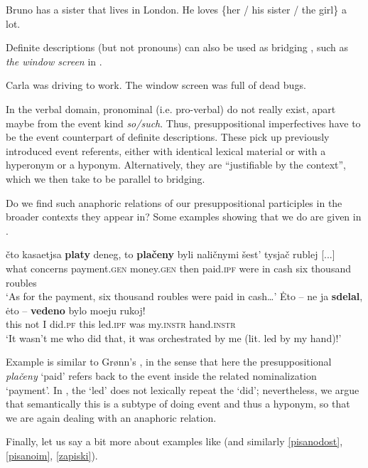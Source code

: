 \documentclass[output=paper,modfonts,newtxmath,hidelinks
\ChapterDOI{10.5281/zenodo.2545513}
]{langscibook}
\begin{document}
\ea Bruno has a sister that lives in London. He loves \{her / his sister / the girl\} a lot.\label{Bruno}
\z

\noindent Definite descriptions (but not pronouns) can also be used as bridging , such as \textit{the window screen} in .

\ea
Carla was driving to work. The window screen was full of dead bugs.\label{Carla}
\z

\noindent In the verbal domain, pronominal (i.e. pro-verbal)  do not really exist, apart maybe from the event kind  \textit{so/such}. Thus, presuppositional imperfectives have to be the event counterpart of definite descriptions. These pick up previously introduced event referents, either with identical lexical material or with a hyperonym or a hyponym. Alternatively, they are ``justifiable by the context'', which we then take to be parallel to bridging.

Do we  find such anaphoric relations of our presuppositional  participles in the broader contexts they appear in? Some examples showing that we do are given in .

\ea\label{anaphOF}
\ea\gll 	čto kasaetjsa \textbf{platy} deneg, to \textbf{plačeny} byli naličnymi šest' tysjač rublej [...]\\
	what concerns payment.\textsc{gen} money.\textsc{gen} then paid.\textsc{ipf} were {in cash} six thousand roubles\\
\glt	`As for the payment, six thousand roubles were paid in cash\dots'\label{platy}
\ex\gll 	\.{E}to -- ne ja \textbf{sdelal}, \.{e}to -- \textbf{vedeno} bylo moeju rukoj!\\
	this {} not I did.\textsc{pf} this {} led.\textsc{ipf} was my.\textsc{instr} hand.\textsc{instr}\\
\glt	`It wasn't me who did that, it was orchestrated by me (lit. led by my hand)!'\label{rukoj}	
\z\z

\noindent Example  is similar to Grønn's , in the sense that here the presuppositional   \textit{plačeny} `paid' refers back to the event inside the related nominalization `payment'. In , the  `led' does not lexically repeat the  `did'; nevertheless, we argue that semantically this is a subtype of doing event and thus a hyponym, so that we are again dealing with an anaphoric relation. 

Finally, let us say a bit more about examples like  (and similarly \ref{pisanodost}, \ref{pisanoim}, \ref{zapiski}). 
\end{document}
